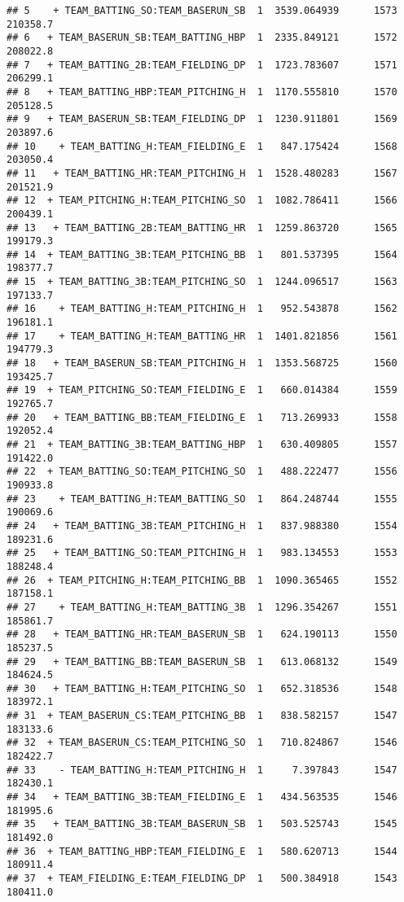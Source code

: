\documentclass[
]{article}
\begin{document}
\begin{verbatim}
## 5    + TEAM_BATTING_SO:TEAM_BASERUN_SB  1  3539.064939      1573   210358.7
## 6   + TEAM_BASERUN_SB:TEAM_BATTING_HBP  1  2335.849121      1572   208022.8
## 7   + TEAM_BATTING_2B:TEAM_FIELDING_DP  1  1723.783607      1571   206299.1
## 8   + TEAM_BATTING_HBP:TEAM_PITCHING_H  1  1170.555810      1570   205128.5
## 9   + TEAM_BASERUN_SB:TEAM_FIELDING_DP  1  1230.911801      1569   203897.6
## 10    + TEAM_BATTING_H:TEAM_FIELDING_E  1   847.175424      1568   203050.4
## 11   + TEAM_BATTING_HR:TEAM_PITCHING_H  1  1528.480283      1567   201521.9
## 12  + TEAM_PITCHING_H:TEAM_PITCHING_SO  1  1082.786411      1566   200439.1
## 13   + TEAM_BATTING_2B:TEAM_BATTING_HR  1  1259.863720      1565   199179.3
## 14  + TEAM_BATTING_3B:TEAM_PITCHING_BB  1   801.537395      1564   198377.7
## 15  + TEAM_BATTING_3B:TEAM_PITCHING_SO  1  1244.096517      1563   197133.7
## 16    + TEAM_BATTING_H:TEAM_PITCHING_H  1   952.543878      1562   196181.1
## 17    + TEAM_BATTING_H:TEAM_BATTING_HR  1  1401.821856      1561   194779.3
## 18   + TEAM_BASERUN_SB:TEAM_PITCHING_H  1  1353.568725      1560   193425.7
## 19  + TEAM_PITCHING_SO:TEAM_FIELDING_E  1   660.014384      1559   192765.7
## 20   + TEAM_BATTING_BB:TEAM_FIELDING_E  1   713.269933      1558   192052.4
## 21  + TEAM_BATTING_3B:TEAM_BATTING_HBP  1   630.409805      1557   191422.0
## 22  + TEAM_BATTING_SO:TEAM_PITCHING_SO  1   488.222477      1556   190933.8
## 23    + TEAM_BATTING_H:TEAM_BATTING_SO  1   864.248744      1555   190069.6
## 24   + TEAM_BATTING_3B:TEAM_PITCHING_H  1   837.988380      1554   189231.6
## 25   + TEAM_BATTING_SO:TEAM_PITCHING_H  1   983.134553      1553   188248.4
## 26  + TEAM_PITCHING_H:TEAM_PITCHING_BB  1  1090.365465      1552   187158.1
## 27    + TEAM_BATTING_H:TEAM_BATTING_3B  1  1296.354267      1551   185861.7
## 28   + TEAM_BATTING_HR:TEAM_BASERUN_SB  1   624.190113      1550   185237.5
## 29   + TEAM_BATTING_BB:TEAM_BASERUN_SB  1   613.068132      1549   184624.5
## 30   + TEAM_BATTING_H:TEAM_PITCHING_SO  1   652.318536      1548   183972.1
## 31  + TEAM_BASERUN_CS:TEAM_PITCHING_BB  1   838.582157      1547   183133.6
## 32  + TEAM_BASERUN_CS:TEAM_PITCHING_SO  1   710.824867      1546   182422.7
## 33    - TEAM_BATTING_H:TEAM_PITCHING_H  1     7.397843      1547   182430.1
## 34   + TEAM_BATTING_3B:TEAM_FIELDING_E  1   434.563535      1546   181995.6
## 35   + TEAM_BATTING_3B:TEAM_BASERUN_SB  1   503.525743      1545   181492.0
## 36  + TEAM_BATTING_HBP:TEAM_FIELDING_E  1   580.620713      1544   180911.4
## 37  + TEAM_FIELDING_E:TEAM_FIELDING_DP  1   500.384918      1543   180411.0

\end{verbatim}
\end{document}
